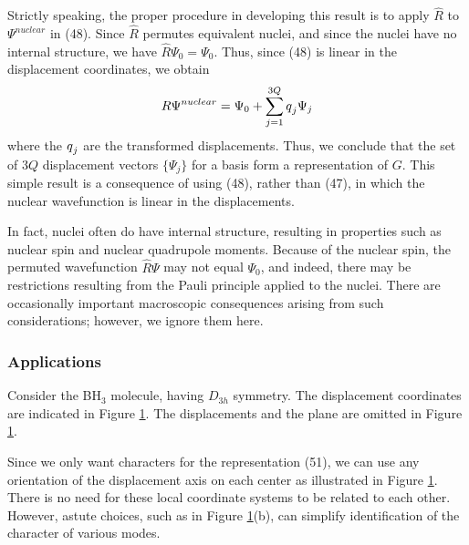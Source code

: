 Strictly speaking, the proper procedure in developing this result is 
to apply $\hat{R}$ to $\Psi^{nuclear}$ in (48).  Since $\hat{R}$ 
permutes equivalent nuclei, and since the nuclei have no internal 
structure, we have $\hat{R} \Psi_0 = \Psi_0$.  Thus, since (48) is 
linear in the displacement coordinates, we obtain 
\begin{equation}
R \Psi^{nuclear} = \Psi_0 + \sum^{3Q}_{j=1} {\- q}_j \Psi_j
\end{equation}
where the ${\-{q}}_j$ are the transformed displacements.  Thus, we 
conclude that the set of $3Q$ displacement vectors $\{ \Psi_j \}$ 
for a basis form a representation of $G$.  This simple result is a 
consequence of using (48), rather than (47), in which the nuclear 
wavefunction is linear in the displacements.

In fact, nuclei often do have internal structure, resulting in 
properties such as nuclear spin and nuclear quadrupole moments.  
Because of the nuclear spin, the permuted wavefunction $\hat{R}\Psi$ 
may not equal $\Psi_0$, and indeed, there may be restrictions 
resulting from the Pauli principle applied to the nuclei. There are 
occasionally important macroscopic consequences arising from such 
considerations; however, we ignore them here.

\subsubsection{Applications}

\begin{figure}
\caption{}
\label{chap16-fig41}
\end{figure}

Consider the BH$_3$ molecule, having $D_{3h}$ symmetry.  The
displacement coordinates are indicated in Figure \ref{chap16-fig41}.
The displacements and the plane are omitted in Figure
\ref{chap16-fig41}.

Since we only want characters for the representation (51), we can use
any orientation of the displacement axis on each center as illustrated
in Figure \ref{chap16-fig41}.  There is no need for these local
coordinate systems to be related to each other. However, astute
choices, such as in Figure \ref{chap16-fig41}(b), can simplify
identification of the character of various modes.

